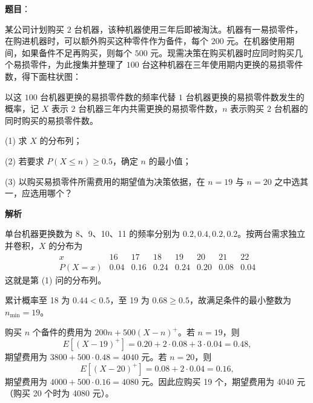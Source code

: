 \begin{answer}

\textbf{题目}：

某公司计划购买 $2$ 台机器，该种机器使用三年后即被淘汰。机器有一易损零件，在购进机器时，可以额外购买这种零件作为备件，每个 $200$ 元。在机器使用期间，如果备件不足再购买，则每个 $500$ 元。现需决策在购买机器时应同时购买几个易损零件，为此搜集并整理了 $100$ 台这种机器在三年使用期内更换的易损零件数，得下面柱状图：
\nopagebreak[4]
\begin{center}\end{center}
\nopagebreak[4]
   以这 $100$ 台机器更换的易损零件数的频率代替 $1$ 台机器更换的易损零件数发生的概率，记 $X$ 表示 $2$ 台机器三年内共需更换的易损零件数，$n$ 表示购买 $2$ 台机器的同时购买的易损零件数。

   (1) 求 $X$ 的分布列；

   (2) 若要求 $P(X\leq n)\geq0.5$，确定 $n$ 的最小值；

   (3) 以购买易损零件所需费用的期望值为决策依据，在 $n=19$ 与 $n=20$ 之中选其一，应选用哪个？

\textbf{解析}


单台机器更换数为 8、9、10、11 的频率分别为 \(0.2,0.4,0.2,0.2\)。按两台需求独立并卷积，\(X\) 的分布为
\nopagebreak[4]
\[
\begin{array}{c|rrrrrrr}
x&16&17&18&19&20&21&22\\\hline
P(X=x)&0.04&0.16&0.24&0.24&0.20&0.08&0.04
\end{array}
\]
这就是第 (1) 问的分布列。


累计概率至 18 为 \(0.44<0.5\)，至 19 为 \(0.68\ge0.5\)，故满足条件的最小整数为 \(n_{\min}=19\)。


购买 \(n\) 个备件的费用为 \(200n+500(X-n)^+\)。若 \(n=19\)，则
\nopagebreak[4]
\[
E[(X-19)^+]=0.20+2\cdot0.08+3\cdot0.04=0.48,
\]
期望费用为 \(3800+500\cdot0.48=4040\) 元。若 \(n=20\)，则
\nopagebreak[4]
\[
E[(X-20)^+]=0.08+2\cdot0.04=0.16,
\]
期望费用为 \(4000+500\cdot0.16=4080\) 元。因此应购买 19 个，期望费用为 4040 元（购买 20 个时为 4080 元）。




\end{answer}
